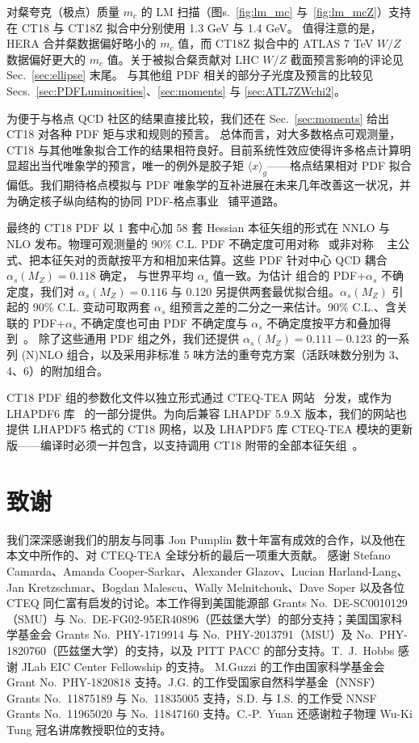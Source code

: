 对粲夸克（极点）质量 $m_c$ 的 LM 扫描（图s.~\ref{fig:lm_mc} 与~\ref{fig:lm_mcZ}）支持在 CT18 与 CT18Z 拟合中分别使用 1.3 GeV 与 1.4 GeV。
值得注意的是，HERA 合并粲数据偏好略小的 $m_c$ 值，而 CT18Z 拟合中的 ATLAS 7 TeV $W/Z$ 数据偏好更大的 $m_c$ 值。关于被拟合粲贡献对 LHC $W/Z$ 截面预言影响的评论见 Sec.~\ref{sec:ellipse} 末尾。
与其他组 PDF 相关的部分子光度及预言的比较见 Secs.~\ref{sec:PDFLuminosities}、\ref{sec:moments} 与 \ref{sec:ATL7ZWchi2}。

为便于与格点 QCD 社区的结果直接比较，我们还在 Sec.~\ref{sec:moments} 给出 CT18 对各种 PDF 矩与求和规则的预言。
总体而言，对大多数格点可观测量，CT18 与其他唯象拟合工作的结果相符良好。目前系统性效应使得许多格点计算明显超出当代唯象学的预言，唯一的例外是胶子矩 $\langle x \rangle_g$——格点结果相对 PDF 拟合偏低。我们期待格点模拟与 PDF 唯象学的互补进展在未来几年改善这一状况，并为确定核子纵向结构的协同 PDF-格点事业~\cite{Hobbs:2019gob,Lin:2017snn} 铺平道路。

最终的 CT18 PDF 以 1 套中心加 58 套
Hessian 本征矢组的形式在 NNLO 与 NLO 发布。物理可观测量的 90\% C.L. PDF
不确定度可用对称~\cite{Pumplin:2002vw} 或非对称
~\cite{Lai:2010vv,Nadolsky:2001yg} 主公式、把本征矢对的贡献按平方和相加来估算。这些 PDF
针对中心 QCD 耦合 $\alpha_s(M_Z)=0.118$ 确定，
与世界平均 $\alpha_s$ 值一致。为估计
组合的 PDF+$\alpha_s$ 不确定度，我们对 $\alpha_s(M_Z)=0.116$ 与 0.120 另提供两套最优拟合组。$\alpha_s(M_Z)$ 引起的
90\% C.L. 变动可取两套 $\alpha_s$ 组预言之差的二分之一来估计。90\% C.L.、含关联的
PDF+$\alpha_s$ 不确定度也可由 PDF 不确定度与 $\alpha_s$
不确定度按平方和叠加得到~\cite{Lai:2010nw}。
除了这些通用 PDF 组之外，我们还提供 $\alpha_s(M_Z)=0.111-0.123$ 的一系列 (N)NLO
组合，以及采用非标准 5 味方法的重夸克方案（活跃味数分别为 3、4、6）的附加组合。

CT18 PDF 组的参数化文件以独立形式通过 CTEQ-TEA 网站~\cite{CT18website} 分发，或作为
LHAPDF6 库~\cite{LHAPDF6} 的一部分提供。为向后兼容 LHAPDF
5.9.X 版本，我们的网站也提供 LHAPDF5 格式的 CT18 网格，以及 LHAPDF5 库 CTEQ-TEA 模块的更新版——编译时必须一并包含，以支持调用 CT18 附带的全部本征矢组~\cite{LHAPDF5}。





\section*{致谢}
我们深深感谢我们的朋友与同事 Jon Pumplin 数十年富有成效的合作，以及他在本文中所作的、对 CTEQ-TEA 全球分析的最后一项重大贡献。
感谢 Stefano Camarda、Amanda Cooper-Sarkar、Alexander Glazov、Lucian Harland-Lang、Jan Kretzschmar、Bogdan Malescu、Wally Melnitchouk、Dave Soper 以及各位 CTEQ 同仁富有启发的讨论。本工作得到美国能源部 Grants No.~DE-SC0010129（SMU）与 No.~DE-FG02-95ER40896（匹兹堡大学）的部分支持；美国国家科学基金会
Grants No.~PHY-1719914 与 No.~PHY-2013791（MSU）及 No.~PHY-1820760（匹兹堡大学）的支持，以及 PITT PACC 的部分支持。T.~J.~Hobbs 感谢 JLab EIC Center Fellowship 的支持。
M.Guzzi 的工作由国家科学基金会 Grant No.~PHY-1820818 支持。J.G. 的工作受国家自然科学基金（NNSF）
Grants No.~11875189 与 No.~11835005 支持，S.D. 与 I.S. 的工作受 NNSF Grants No.~11965020 与 No.~11847160 支持。C.-P.~Yuan 还感谢粒子物理 Wu-Ki Tung 冠名讲席教授职位的支持。
